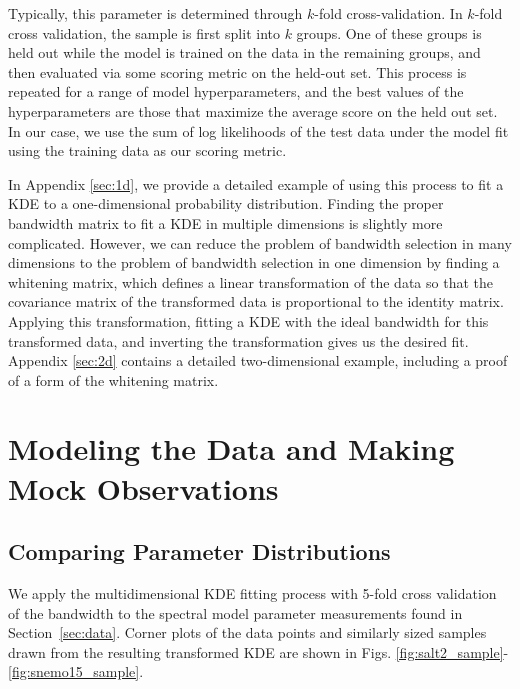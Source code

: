 Typically, this parameter is determined through $k$-fold cross-validation. In $k$-fold cross validation, the sample is first split into $k$ groups. One of these groups is held out while the model is trained on the data in the remaining groups, and then evaluated via some scoring metric on the held-out set. This process is repeated for a range of model hyperparameters, and the best values of the hyperparameters are those that maximize the average score on the held out set. In our case, we use the sum of log likelihoods of the test data under the model fit using the training data as our scoring metric.

In Appendix \ref{sec:1d}, we provide a detailed example of using this process to fit a KDE to a one-dimensional probability distribution. Finding the proper bandwidth matrix to fit a KDE in multiple dimensions is slightly more complicated. However, we can reduce the problem of bandwidth selection in many dimensions to the problem of bandwidth selection in one dimension by finding a whitening matrix, which defines a linear transformation of the data so that the covariance matrix of the transformed data is proportional to the identity matrix. Applying this transformation, fitting a KDE with the ideal bandwidth for this transformed data, and inverting the transformation gives us the desired fit. Appendix \ref{sec:2d} contains a detailed two-dimensional example, including a proof of a form of the whitening matrix.

\section{Modeling the Data and Making Mock Observations}
\label{sec:making_mocks}
\subsection{Comparing Parameter Distributions}
We apply the multidimensional KDE fitting process with 5-fold cross validation of the bandwidth to the spectral model parameter measurements found in Section~\ref{sec:data}. Corner plots of the data points and similarly sized samples drawn from the resulting transformed KDE are shown in Figs. \ref{fig:salt2_sample}-\ref{fig:snemo15_sample}.

